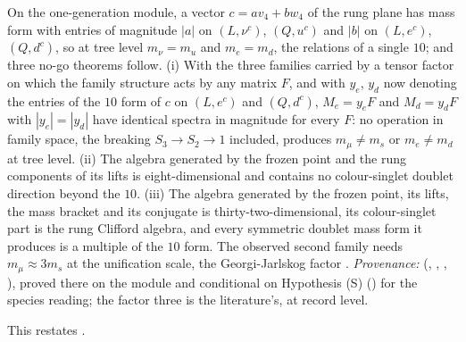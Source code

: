 On the one-generation module, a vector $c = a v_{4} + b w_{4}$ of the rung plane has mass form with entries of magnitude $|a|$ on $(L, \nu^{c})$, $(Q, u^{c})$ and $|b|$ on $(L, e^{c})$, $(Q, d^{c})$, so at tree level $m_{\nu} = m_{u}$ and $m_{e} = m_{d}$, the relations of a single $10$; and three no-go theorems follow. (i) With the three families carried by a tensor factor on which the family structure acts by any matrix $F$, and with $y_{e}$, $y_{d}$ now denoting the entries of the $10$ form of $c$ on $(L, e^{c})$ and $(Q, d^{c})$, $M_{e} = y_{e}F$ and $M_{d} = y_{d}F$ with $|y_{e}| = |y_{d}|$ have identical spectra in magnitude for every $F$: no operation in family space, the breaking $S_{3} \to S_{2} \to 1$ included, produces $m_{\mu} \neq m_{s}$ or $m_{e} \neq m_{d}$ at tree level. (ii) The algebra generated by the frozen point and the rung components of its lifts is eight-dimensional and contains no colour-singlet doublet direction beyond the $10$. (iii) The algebra generated by the frozen point, its lifts, the mass bracket and its conjugate is thirty-two-dimensional, its colour-singlet part is the rung Clifford algebra, and every symmetric doublet mass form it produces is a multiple of the $10$ form. The observed second family needs $m_{\mu} \approx 3 m_{s}$ at the unification scale, the Georgi-Jarlskog factor \cite{GeorgiJarlskog1979}. \emph{Provenance:} \cite[Cor.~9.25, Thms.~9.31, 9.33, 9.35]{ButlerT12} (, , , ), proved there on the module and conditional on Hypothesis (S) () for the species reading; the factor three is the literature's, at record level.

This restates .
